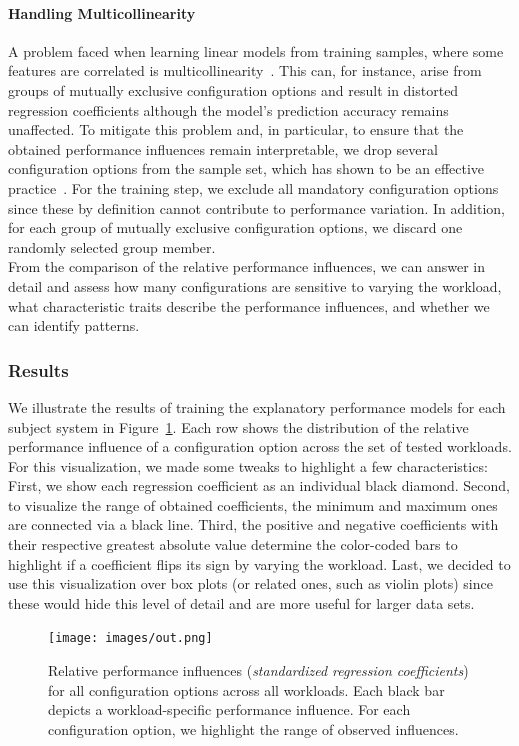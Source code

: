 {\paragraph*{Handling Multicollinearity}A problem faced when learning linear models from training samples, where some features are correlated is multicollinearity~\cite{Daoud_2017}. This can, for instance, arise from groups of mutually exclusive configuration options and result in distorted regression coefficients although the model's prediction accuracy remains unaffected. To mitigate this problem and, in particular, to ensure that the obtained performance influences remain interpretable, we drop several configuration options from the sample set, which has shown to be an effective practice~\cite{dorn2020}. For the training step, we exclude all mandatory configuration options since these by definition cannot contribute to performance variation. In addition, for each group of mutually exclusive configuration options, we discard one randomly selected group member. \\

From the comparison of the relative performance influences, we can answer  in detail and assess how many configurations are sensitive to varying the workload, what characteristic traits describe the performance influences, and whether we can identify patterns.
\subsubsection{Results}
We illustrate the results of training the explanatory performance models for each subject system in Figure~\ref{fig:results_influence}. Each row shows the distribution of the relative performance influence of a configuration option across the set of tested workloads. For this visualization, we made some tweaks to highlight a few characteristics: First, we show each regression coefficient as an individual black diamond. Second,  to visualize the range of obtained coefficients, the minimum and maximum ones are connected via a black line. Third, the positive and negative coefficients with their respective greatest absolute value determine the color-coded bars to highlight if a coefficient flips its sign by varying the workload. Last, we decided to use this visualization over box plots (or related ones, such as violin plots) since these would hide this level of detail and are more useful for larger data sets.

\begin{figure}
	\centering
	\texttt{[image: images/out.png]}
	\caption{Relative performance influences (\textit{standardized regression coefficients}) for all configuration options across all workloads. Each black bar depicts a workload-specific performance influence. For each configuration option, we highlight the range of observed influences.}
	\label{fig:results_influence}
\end{figure}

}

